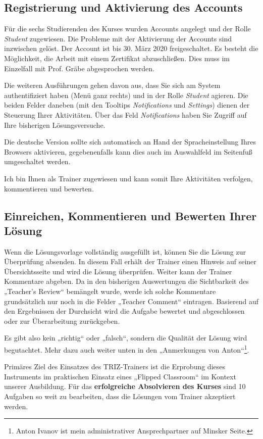 \documentclass[11pt,a4paper]{article}
\begin{document}
\subsection{Registrierung und Aktivierung des Accounts}

Für die sechs Studierenden des Kurses wurden Accounts angelegt und der Rolle
\emph{Student} zugewiesen.  Die Probleme mit der Aktivierung der Accounts sind
inzwischen gelöst. Der Account ist bis 30. März 2020 freigeschaltet.  Es
besteht die Möglichkeit, die Arbeit mit einem Zertifikat abzuschließen. Dies
muss im Einzelfall mit Prof. Gräbe abgesprochen werden.

Die weiteren Ausführungen gehen davon aus, dass Sie sich am System
authentifiziert haben (Menü ganz rechts) und in der Rolle \emph{Student}
agieren.  Die beiden Felder daneben (mit den Tooltips \emph{Notifications} und
\emph{Settings}) dienen der Steuerung Ihrer Aktivitäten. Über das Feld
\emph{Notifications} haben Sie Zugriff auf Ihre bisherigen Lösungsversuche.

Die deutsche Version sollte sich automatisch an Hand der Spracheinstellung
Ihres Browsers aktivieren, gegebenenfalls kann dies auch im Auswahlfeld im
Seitenfuß umgeschaltet werden.  

Ich bin Ihnen als Trainer zugewiesen und kann somit Ihre Aktivitäten
verfolgen, kommentieren und bewerten.

\subsection{Einreichen, Kommentieren und Bewerten Ihrer Lösung}

Wenn die Lösungsvorlage vollständig ausgefüllt ist, können Sie die Lösung zur
Überprüfung absenden. In diesem Fall erhält der Trainer einen Hinweis auf
seiner Übersichtsseite und wird die Lösung überprüfen.  Weiter kann der
Trainer Kommentare abgeben. Da in den bisherigen Auswertungen die Sichtbarkeit
des „Teacher's Review“ bemängelt wurde, werde ich solche Kommentare
grundsätzlich nur noch in die Felder „Teacher Comment“ eintragen.  Basierend
auf den Ergebnissen der Durchsicht wird die Aufgabe bewertet und abgeschlossen
oder zur Überarbeitung zurückgeben.

Es gibt also kein „richtig“ oder „falsch“, sondern die Qualität der Lösung
wird begutachtet. Mehr dazu auch weiter unten in den „Anmerkungen von
Anton“\footnote{Anton Ivanov ist mein administrativer Ansprechpartner auf
  Minsker Seite.}.

Primäres Ziel des Einsatzes des TRIZ-Trainers ist die Erprobung dieses
Instruments im praktischen Einsatz eines „Flipped Classroom“ im Kontext
unserer Ausbildung.  Für das \textbf{erfolgreiche Absolvieren des Kurses} sind
10 Aufgaben so weit zu bearbeiten, dass die Lösungen vom Trainer akzeptiert
werden. 
\end{document}
